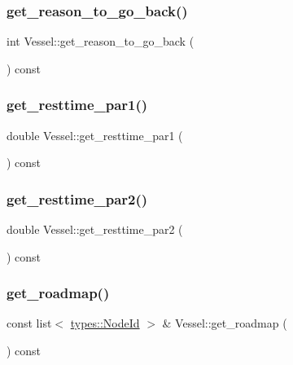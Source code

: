 \subsubsection{\texorpdfstring{get\_reason\_to\_go\_back()}{get\_reason\_to\_go\_back()}}
{\footnotesize\ttfamily int Vessel\+::get\+\_\+reason\+\_\+to\+\_\+go\+\_\+back (\begin{DoxyParamCaption}{ }\end{DoxyParamCaption}) const}

\mbox{\label{class_vessel_af4d21d4180cb1061e617cae7eb0f71d4}} 
\subsubsection{\texorpdfstring{get\_resttime\_par1()}{get\_resttime\_par1()}}
{\footnotesize\ttfamily double Vessel\+::get\+\_\+resttime\+\_\+par1 (\begin{DoxyParamCaption}{ }\end{DoxyParamCaption}) const}

\mbox{\label{class_vessel_a03139a9d094ed1add3bc65bb64dadefe}} 
\subsubsection{\texorpdfstring{get\_resttime\_par2()}{get\_resttime\_par2()}}
{\footnotesize\ttfamily double Vessel\+::get\+\_\+resttime\+\_\+par2 (\begin{DoxyParamCaption}{ }\end{DoxyParamCaption}) const}

\mbox{\label{class_vessel_a4b9c3a1c828a54b903c61d80539f1eaf}} 
\subsubsection{\texorpdfstring{get\_roadmap()}{get\_roadmap()}}
{\footnotesize\ttfamily const list$<$ \mbox{\hyperlink{classtypes_1_1_node_id}{types\+::\+Node\+Id}} $>$ \& Vessel\+::get\+\_\+roadmap (\begin{DoxyParamCaption}{ }\end{DoxyParamCaption}) const}

